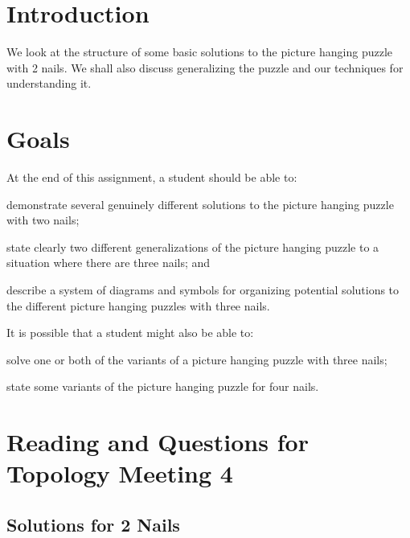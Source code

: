 \documentclass[12pt,letterpaper]{article}
\theoremstyle{definition}
\begin{document}
\setlength{\parskip}{1ex plus 0.5ex minus 0.2ex}
\setlength{\parindent}{0pt}

\pagestyle{fancy}
\cfoot{}

\section*{Introduction}
We look at the structure of some basic solutions to the picture hanging puzzle with 2 nails.
We shall also discuss generalizing the puzzle and our techniques for understanding it.

\section*{Goals}
At the end of this assignment, a student should be able to:
\begin{compactitem}
\item demonstrate several genuinely different solutions to the picture hanging puzzle with two nails;
\item state clearly two different generalizations of the picture hanging puzzle to a situation where there are three nails; and
\item describe a system of diagrams and symbols for organizing potential solutions to the different picture hanging puzzles with three nails.
\end{compactitem}
It is possible that a student might also be able to:
\begin{compactitem}
\item solve one or both of the variants of a picture hanging puzzle with three nails;
\item state some variants of the picture hanging puzzle for four nails.
\end{compactitem}

\section*{Reading and Questions for Topology Meeting 4}

\subsection*{Solutions for 2 Nails}
\end{document}
